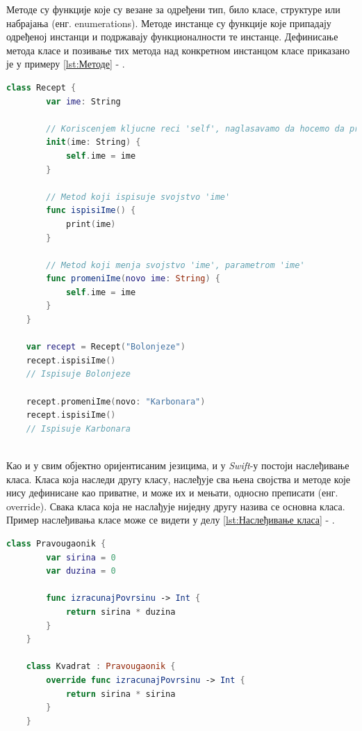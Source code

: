 \documentclass[12pt,oneside]{memoir}
\begin{document}
\indent Методе су функције које су везане за одређени тип, било класе, структуре или набрајања (енг. enumerations). Методе инстанце су функције које припадају одређеној инстанци и подржавају функционалности те инстанце. Дефинисање метода класе и позивање тих метода над конкретном инстанцом класе приказано је у примеру \ref{lst:Методе} - .

\begin{lstlisting}[caption=\textit{{Методе}}, label={lst:Методе}, language=Swift, frame=single]
    class Recept {
        var ime: String
        
        // Koriscenjem kljucne reci 'self', naglasavamo da hocemo da pristupimo svojstvu klase
        init(ime: String) {
            self.ime = ime
        }
        
        // Metod koji ispisuje svojstvo 'ime'
        func ispisiIme() {
            print(ime)
        }
        
        // Metod koji menja svojstvo 'ime', parametrom 'ime'
        func promeniIme(novo ime: String) {
            self.ime = ime
        }
    }
    
    var recept = Recept("Bolonjeze")
    recept.ispisiIme()
    // Ispisuje Bolonjeze
    
    recept.promeniIme(novo: "Karbonara")
    recept.ispisiIme()
    // Ispisuje Karbonara
    
\end{lstlisting}

\indent Као и у свим објектно оријентисаним језицима, и у \textit{Swift}-у постоји наслеђивање класа. Класа која наследи другу класу, наслеђује сва њена својства и методе које нису дефинисане као приватне, и може их и мењати, односно преписати (енг. override). Свака класа која не наслађује ниједну другу назива се основна класа. Пример наслеђивања класе може се видети у делу \ref{lst:Наслеђивање класа} - .

\begin{lstlisting}[caption=\textit{{Наслеђивање класа}}, label={lst:Наслеђивање класа}, language=Swift, frame=single]
    class Pravougaonik {
        var sirina = 0
        var duzina = 0
        
        func izracunajPovrsinu -> Int {
            return sirina * duzina
        }
    }
    
    class Kvadrat : Pravougaonik {
        override func izracunajPovrsinu -> Int {
            return sirina * sirina
        }
    }
\end{lstlisting}
\end{document}
